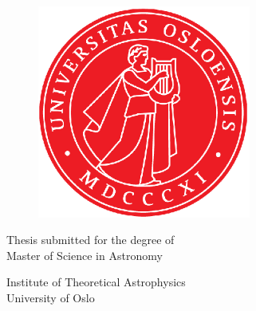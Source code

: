 \newlength{\vtitle}
\setlength{\vtitle}{1cm}

\begin{titlepage}
\begin{center}

\bfseries
\LARGE
\@title

\vspace{\vtitle}
\Large
\@author

\vspace{\vtitle}
\begin{figure}[h]
\centering
\includegraphics[width=7cm]{uiologo.eps}
\end{figure}

\vspace{\vtitle}
\Large
Thesis submitted for the degree of \\
Master of Science in Astronomy

\vspace{\fill}
\large
Institute of Theoretical Astrophysics\\
University of Oslo \\
\@date

\end{center}
\normalfont

\end{titlepage}

